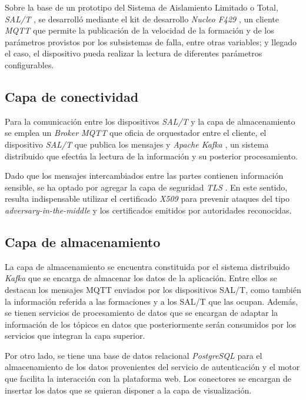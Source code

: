 Sobre la base de un prototipo del Sistema de Aislamiento Limitado o Total, \textit{SAL/T} \cite{b1}, se desarrolló mediante el kit de desarrollo \textit{Nucleo F429} \cite{b8}, un cliente \textit{MQTT} que permite la publicación de la velocidad de la formación y de los parámetros provistos por los subsistemas de falla, entre otras variables; y llegado el caso, el dispositivo pueda realizar la lectura de diferentes parámetros configurables.

\subsection{Capa de conectividad}

Para la comunicación entre los dispositivos \textit{SAL/T} y la capa de almacenamiento se emplea un \textit{Broker MQTT} que oficia de orquestador entre el cliente, el dispositivo \textit{SAL/T} que publica los mensajes y \textit{Apache Kafka} \cite{b9}, un sistema distribuido que efectúa la lectura de la información y su posterior procesamiento. 

Dado que los mensajes intercambiados entre las partes contienen información sensible, se ha optado por agregar la capa de seguridad \textit{TLS} \cite{b10}. En este sentido, resulta indispensable utilizar el certificado \textit{X509} \cite{b11} para prevenir ataques del tipo \textit{adversary-in-the-middle} \cite{b12} y los certificados emitidos por autoridades reconocidas.


\subsection{Capa de almacenamiento}

La capa de almacenamiento se encuentra constituida por el sistema distribuido \textit{Kafka} que se encarga de almacenar los datos de la aplicación. Entre ellos se destacan los mensajes MQTT enviados por los dispositivos SAL/T, como también la información referida a las formaciones y a los SAL/T que las ocupan. Además, se tienen servicios de procesamiento de datos que se encargan de adaptar la información de los tópicos en datos que posteriormente serán consumidos por los servicios que integran la capa superior.

Por otro lado, se tiene una base de datos relacional \textit{PostgreSQL} \cite{b13} para el almacenamiento de los datos provenientes del servicio de autenticación y el motor que facilita la interacción con la plataforma web. Los conectores se encargan de insertar los datos que se quieran disponer a la capa de visualización.

